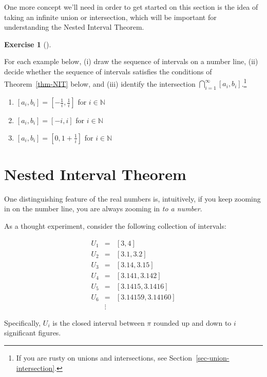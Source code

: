 \documentclass[
  letterpaper,
  DIV=11,
  numbers=noendperiod]{scrreprt}
\providecommand{\tightlist}{%
  \setlength{\itemsep}{0pt}\setlength{\parskip}{0pt}}
\def\N{\mathbb N}
\theoremstyle{plain}
\theoremstyle{definition}
\newtheorem{exercise}{Exercise}[chapter]
\theoremstyle{plain}
\theoremstyle{plain}
\theoremstyle{definition}
\theoremstyle{definition}
\theoremstyle{remark}
\begin{document}
One more concept we'll need in order to get started on this section is
the idea of taking an infinite union or intersection, which will be
important for understanding the Nested Interval Theorem.

\begin{exercise}[]\protect\hypertarget{exr-intersection-practice}{}\label{exr-intersection-practice}

For each example below, (i) draw the sequence of intervals on a number
line, (ii) decide whether the sequence of intervals satisfies the
conditions of Theorem~\ref{thm-NIT} below, and (iii) identify the
intersection
\(\displaystyle \bigcap_{i=1}^\infty [a_i,b_i]\).\footnote{If you are
  rusty on unions and intersections, see
  Section~\ref{sec-union-intersection}.}

\begin{enumerate}
\def\labelenumi{\arabic{enumi}.}
\tightlist
\item
  \([a_i,b_i]=\left[-\frac{1}{i},\frac{1}{i}\right]\) for \(i\in\N\)
\item
  \([a_i,b_i]=[-i,i]\) for \(i\in\N\)
\item
  \([a_i,b_i]=\left[0,1+\frac{1}{i}\right]\) for \(i\in\N\)
\end{enumerate}

\end{exercise}

\section{Nested Interval Theorem}\label{nested-interval-theorem}

One distinguishing feature of the real numbers is, intuitively, if you
keep zooming in on the number line, you are always zooming in \emph{to a
number}.

As a thought experiment, consider the following collection of intervals:

\[\begin{aligned}
  U_1&=&[3,4]\\ 
  U_2&=&[3.1,3.2]\\ 
  U_3&=&[3.14,3.15]\\ 
  U_4&=&[3.141,3.142]\\ 
  U_5&=&[3.1415,3.1416]\\
  U_6&=&[3.14159,3.14160]\\
  &\vdots&
\end{aligned}\]

Specifically, \(U_i\) is the closed interval between \(\pi\) rounded up
and down to \(i\) significant figures.
\end{document}

